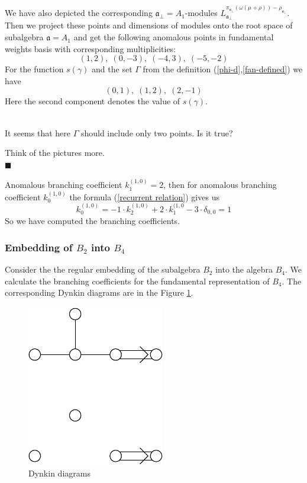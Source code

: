 \documentclass[a4paper,12pt]{article}
\theoremstyle{definition} \newtheorem{Def}{Definition}
\newenvironment{comment}
{\par\noindent{\bf TODO}\\}
{\\\hfill$\scriptstyle\blacksquare$\par}
\begin{document}
We have also depicted the corresponding $\mathfrak{a}_{\bot}=A_1$-modules $L^{\pi_{\mathfrak{a}_{\bot}}(\omega(\mu+\rho))-\rho_{\mathfrak{a}_{\bot}}}_{\mathfrak{a}_{\bot}}$.
Then we project these points and dimensions of modules onto the root space of subalgebra $\mathfrak{a}=A_1$ and get the following anomalous points in fundamental weights basis with corresponding multiplicities:
\begin{equation}
  \label{eq:25}
  (1,2),\; (0,-3),\; (-4,3),\; (-5,-2)
\end{equation}
For the function $s(\gamma)$ and the set $\Gamma$ from the definition (\ref{phi-d},\ref{fan-defined}) we have
\begin{equation}
  \label{eq:22}
  (0,1),\; (1,2),\; (2,-1)
\end{equation}
Here the second component denotes the value of $s(\gamma)$.
\begin{comment}
  It seems that here $\Gamma$ should include only two points. Is it true?

  Think of the pictures more.
\end{comment}
Anomalous branching coefficient $k^{(1,0)}_{1}=2$, then for anomalous branching coefficient $k^{(1,0)}_{0}$ the formula (\ref{recurrent relation}) gives us
\begin{equation}
  \label{eq:23}
  k^{(1,0)}_{0}=-1\cdot k^{(1,0)}_2 +2\cdot k^{(1,0}_1 - 3\cdot \delta_{0,0} = 1
\end{equation}
So we have computed the branching coefficients.
\subsubsection{Embedding of $B_2$ into $B_4$}
\label{sec:someth-high-dimens}
Consider the the regular embedding of the subalgebra $B_2$ into the algebra $B_4$.
We calculate the branching coefficients for the fundamental representation of $B_4$.
The corresponding Dynkin diagrams are in the Figure \ref{fig:dynkin}.
\begin{figure}[ph]
  \centering
  \includegraphics[width=60mm]{B4_B2_2A1.pdf}
  \caption{Dynkin diagrams}
  \label{fig:dynkin}
\end{figure}
\end{document}
